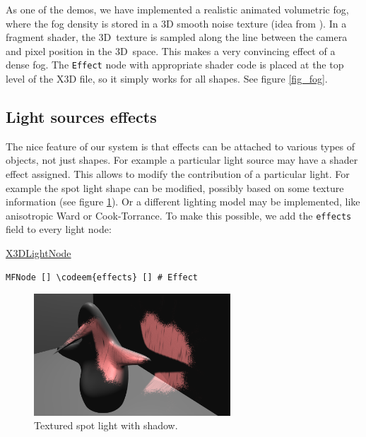 \documentclass{egpubl}
\newenvironment{mycode}
{\begin{mycodecore}}
{\end{mycodecore}
\vspace{-0.1in}}
\newcommand*{\codeem}[1]{\textbf{#1}}
\begin{document}
As one of the demos, we have implemented a realistic
animated volumetric fog, where the fog density is stored in
a 3D smooth noise texture (idea from \cite{humus:volumetricfog}).
In a fragment shader, the 3D~texture is sampled
along the line between the camera and pixel position in the 3D~space. This makes a very
convincing effect of a dense fog. The \texttt{Effect} node with
appropriate shader code is placed at the top level of the X3D file,
so it simply works for all shapes. See figure \ref{fig_fog}.

\subsection{Light sources effects}

The nice feature of our system is that effects can be attached to various
types of objects, not just shapes. For example a particular light source
may have a shader effect assigned.
This allows to modify the contribution of a particular light.
For example the spot light shape can be modified, possibly
based on some texture information (see figure \ref{fig_fancy_spot}).
Or a different lighting model may be implemented, like anisotropic Ward
or Cook-Torrance.
To make this possible, we add the \texttt{effects} field to every light node:

\begin{mycode}
\underline{X3DLightNode}
\begin{Verbatim}[commandchars=\\\{\},fontsize=\small]
MFNode [] \codeem{effects} [] # Effect
\end{Verbatim}
\end{mycode}

\begin{figure}[H]
  \centering
  \includegraphics[width=2.9in]{fancy_light_spot_shape-cropped}
  \caption{Textured spot light with shadow.}
  \label{fig_fancy_spot}
\end{figure}

\end{document}
